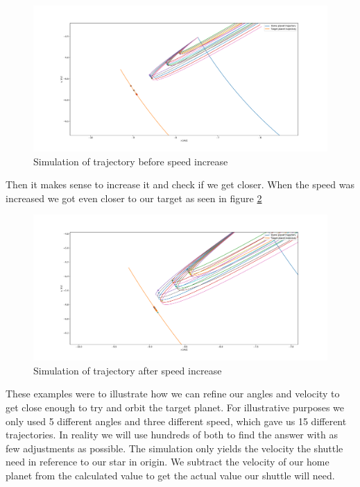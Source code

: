 \documentclass[reprint,english,notitlepage]{revtex4-2}
\begin{document}
\begin{figure}[h!]
  \centering
  \includegraphics[scale = .125]{Figures/pre_speed_increase.pdf}
  \caption{Simulation of trajectory before speed increase}
  \label{fig: pre speed increase}
\end{figure}

Then it makes sense to increase it and check if we get closer. When the speed was increased we got even closer to our target as seen in figure \ref{fig: post speed increase}

\begin{figure}[h!]
  \centering
  \includegraphics[scale = .125]{Figures/post_speed_increase.pdf}
  \caption{Simulation of trajectory after speed increase}
  \label{fig: post speed increase}
\end{figure}

These examples were to illustrate how we can refine our angles and velocity to get close enough to try and orbit the target planet. For illustrative purposes we only used 5 different angles and three different speed, which gave us 15 different trajectories. In reality we will use hundreds of both to find the answer with as few adjustments as possible.
The simulation only yields the velocity the shuttle need in reference to our star in origin. We subtract the velocity of our home planet from the calculated value to get the actual value our shuttle will need. 
\end{document}

